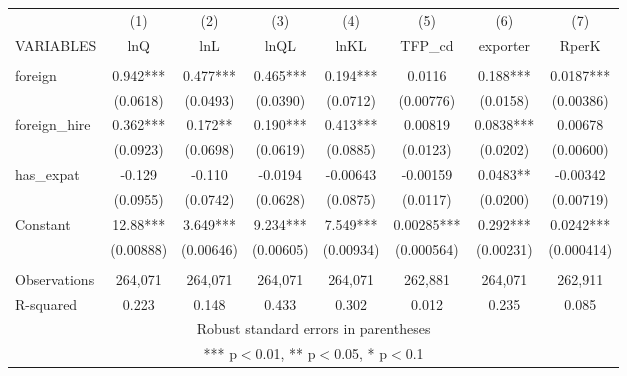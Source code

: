\documentclass[]{article}
\begin{document}
\begin{tabular}{lccccccc} \hline
 & (1) & (2) & (3) & (4) & (5) & (6) & (7) \\
VARIABLES & lnQ & lnL & lnQL & lnKL & TFP\_cd & exporter & RperK \\ \hline
 &  &  &  &  &  &  &  \\
foreign & 0.942*** & 0.477*** & 0.465*** & 0.194*** & 0.0116 & 0.188*** & 0.0187*** \\
 & (0.0618) & (0.0493) & (0.0390) & (0.0712) & (0.00776) & (0.0158) & (0.00386) \\
foreign\_hire & 0.362*** & 0.172** & 0.190*** & 0.413*** & 0.00819 & 0.0838*** & 0.00678 \\
 & (0.0923) & (0.0698) & (0.0619) & (0.0885) & (0.0123) & (0.0202) & (0.00600) \\
has\_expat & -0.129 & -0.110 & -0.0194 & -0.00643 & -0.00159 & 0.0483** & -0.00342 \\
 & (0.0955) & (0.0742) & (0.0628) & (0.0875) & (0.0117) & (0.0200) & (0.00719) \\
Constant & 12.88*** & 3.649*** & 9.234*** & 7.549*** & 0.00285*** & 0.292*** & 0.0242*** \\
 & (0.00888) & (0.00646) & (0.00605) & (0.00934) & (0.000564) & (0.00231) & (0.000414) \\
 &  &  &  &  &  &  &  \\
Observations & 264,071 & 264,071 & 264,071 & 264,071 & 262,881 & 264,071 & 262,911 \\
 R-squared & 0.223 & 0.148 & 0.433 & 0.302 & 0.012 & 0.235 & 0.085 \\ \hline
\multicolumn{8}{c}{ Robust standard errors in parentheses} \\
\multicolumn{8}{c}{ *** p$<$0.01, ** p$<$0.05, * p$<$0.1} \\
\end{tabular}
\end{document}
